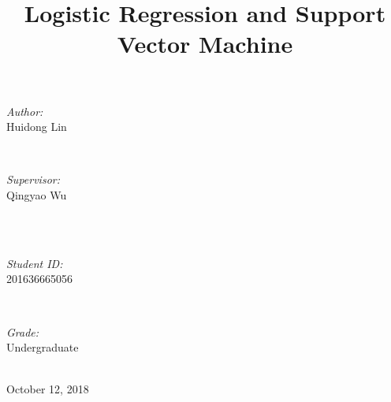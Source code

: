 \documentclass[journal, a4paper]{IEEEtran}
\begin{document}
\begin{titlepage}
\begin{minipage}{0.4\textwidth}
\begin{flushleft} \large
\emph{Author:}\\
Huidong Lin %
\end{flushleft}
\end{minipage}
~
\begin{minipage}{0.4\textwidth}
\begin{flushright} \large
\emph{Supervisor:} \\
Qingyao Wu %
\end{flushright}
\end{minipage}\\[2cm]
~
\begin{minipage}{0.4\textwidth}
\begin{flushleft} \large
\emph{Student ID:}\\
201636665056
\end{flushleft}
\end{minipage}
~
\begin{minipage}{0.4\textwidth}
\begin{flushright} \large
\emph{Grade:} \\
Undergraduate
\end{flushright}
\end{minipage}\\[2cm]



{\large October 12, 2018}\\[2cm] %

 

\vfill %

\end{titlepage}

	\title{Logistic Regression and Support Vector Machine}
	\maketitle
\end{document}
